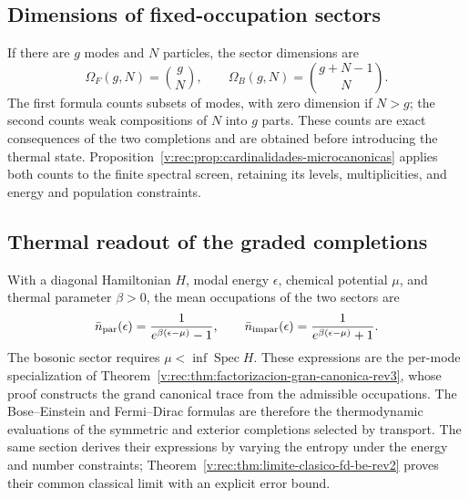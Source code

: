 \subsection{Dimensions of fixed-occupation sectors}
\label{v:rec:completaciones:section:07}

If there are \(g\) modes and \(N\) particles, the sector dimensions are
\begin{equation}
 \Omega_F(g,N)=\binom gN,
 \qquad
 \Omega_B(g,N)=\binom{g+N-1}{N}.
 \label{v:ocupacion:eq:dimensiones-sectores}
\end{equation}
The first formula counts subsets of modes, with zero dimension if
\(N>g\); the second counts weak compositions of \(N\) into \(g\) parts.
These counts are exact consequences of the two completions and are
obtained before introducing the thermal state.
Proposition~\ref{v:rec:prop:cardinalidades-microcanonicas} applies both
counts to the finite spectral screen, retaining its levels,
multiplicities, and energy and population constraints.

\subsection{Thermal readout of the graded completions}
\label{v:ocupacion:lectura-termica}

With a diagonal Hamiltonian \(H\), modal energy \(\epsilon\), chemical
potential \(\mu\), and thermal parameter \(\beta>0\), the mean occupations
of the two sectors are
\begin{equation}
 \bar n_{\rm par}(\epsilon)
 =\frac{1}{e^{\beta(\epsilon-\mu)}-1},
 \qquad
 \bar n_{\rm impar}(\epsilon)
 =\frac{1}{e^{\beta(\epsilon-\mu)}+1}.
 \label{v:ocupacion:eq:leyes-por-modo}
\end{equation}
The bosonic sector requires \(\mu<\inf\operatorname{Spec}H\).
These expressions are the per-mode specialization of
Theorem~\ref{v:rec:thm:factorizacion-gran-canonica-rev3}, whose proof
constructs the grand canonical trace from the admissible occupations.
The Bose--Einstein and Fermi--Dirac formulas are therefore the
thermodynamic evaluations of the symmetric and exterior completions
selected by transport. The same section derives their expressions
by varying the entropy under the energy and number constraints;
Theorem~\ref{v:rec:thm:limite-clasico-fd-be-rev2} proves their
common classical limit with an explicit error bound.
